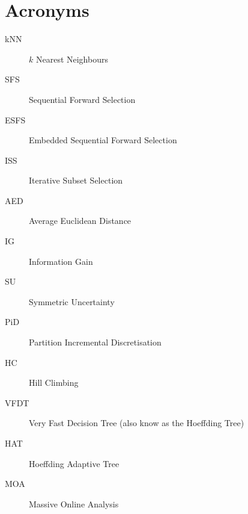 \chapter{Acronyms}

\begin{description}
\item[kNN]
$k$ Nearest Neighbours
\item[SFS]
Sequential Forward Selection
\item[ESFS]
Embedded Sequential Forward Selection
\item[ISS]
Iterative Subset Selection
\item[AED]
Average Euclidean Distance
\item[IG]
Information Gain
\item[SU]
Symmetric Uncertainty
\item[PiD]
Partition Incremental Discretisation
\item[HC]
Hill Climbing
\item[VFDT]
Very Fast Decision Tree (also know as the Hoeffding Tree)
\item[HAT]
Hoeffding Adaptive Tree
\item[MOA]
Massive Online Analysis
\end{description}